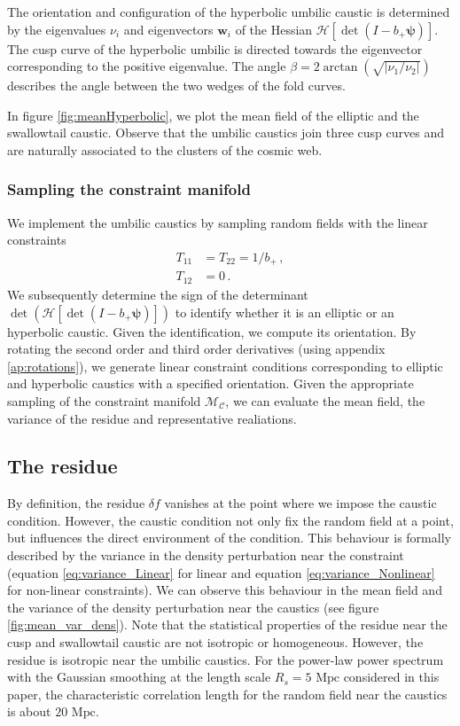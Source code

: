 \documentclass[a4paper, 11pt]{article}
\begin{document}
The orientation and configuration of the hyperbolic umbilic caustic is determined by the eigenvalues $\nu_i$ and eigenvectors $\bm{w}_i$ of the Hessian $\mathcal{H}\left[\det (I- b_+ \bm{\psi})\right]$. The cusp curve of the hyperbolic umbilic is directed towards the eigenvector corresponding to the positive eigenvalue. The angle $\beta = 2 \arctan(\sqrt{|\nu_1/\nu_2|})$ describes the angle between the two wedges of the fold curves. 


In figure \ref{fig:meanHyperbolic}, we plot the mean field of the elliptic and the swallowtail caustic. Observe that the umbilic caustics join three cusp curves and are naturally associated to the clusters of the cosmic web.




\subsubsection{Sampling the constraint manifold}
We implement the umbilic caustics by sampling random fields with the linear constraints
\begin{align}
T_{11}&=T_{22}=1/b_+\,,\\
T_{12}&=0\,.
\end{align}
We subsequently determine the sign of the determinant $\det\left( \mathcal{H}\left[\det (I- b_+ \bm{\psi})\right]\right)$ to identify whether it is an elliptic or an hyperbolic caustic. Given the identification, we compute its orientation. By rotating the second order and third order derivatives (using appendix \ref{ap:rotations}), we generate linear constraint conditions corresponding to elliptic and hyperbolic caustics with a specified orientation. Given the appropriate sampling of the constraint manifold $\mathcal{M}_\mathcal{C}$, we can evaluate the mean field, the variance of the residue and representative realiations.


\subsection{The residue}
By definition, the residue $\delta f$ vanishes at the point where we impose the caustic condition. However, the caustic condition not only fix the random field at a point, but influences the direct environment of the condition. This behaviour is formally described by the variance in the density perturbation near the constraint (equation \eqref{eq:variance_Linear} for linear and equation \eqref{eq:variance_Nonlinear} for non-linear constraints). We can observe this behaviour in the mean field and the variance of the density perturbation near the caustics (see figure \ref{fig:mean_var_dens}). Note that the statistical properties of the residue near the cusp and swallowtail caustic are not isotropic or homogeneous. However, the residue is isotropic near the umbilic caustics. For the power-law power spectrum with the Gaussian smoothing at the length scale $R_s=5\text{ Mpc}$ considered in this paper, the characteristic correlation length for the random field near the caustics is about $20\text{ Mpc}$.
\end{document}

